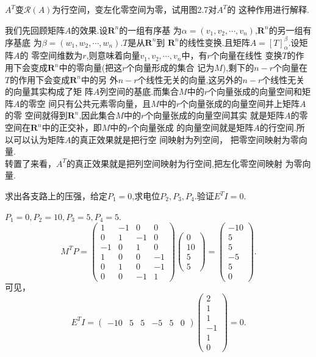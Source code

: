 ﻿\documentclass{book} \usepackage{exsheets} \usepackage{xeCJK}
\begin{document}
\begin{question}
  $A^T$变$\mathcal{R}(A)$为行空间，变左化零空间为零，试用图2.7对$A^T$的
  这种作用进行解释.
\end{question}
\begin{solution}
  我们先回顾矩阵$A$的效果.设$\mathbf{R}^{n}$的一组有序基
  为$\alpha=(v_1,v_2,\cdots,v_n)$,$\mathbf{R}^{n}$的另一组有序基底
  为$\beta=(w_{1},w_{2},\cdots,w_{n})$.$T$是从$\mathbf{R}^{n}$到
  $\mathbf{R}^{n}$的线性变换.且矩阵$A=[T]_{\alpha}^{\beta}$.设矩阵$A$的
  零空间维数为$r$,则意味着向量$v_1,v_2,\cdots,v_n$中，有$r$个向量在线性
  变换$T$的作用下会变成$\mathbf{R}^n$中的零向量(把这$r$个向量形成的集合
  记为$M$),剩下的$n-r$个向量在$T$的作用下会变成$\mathbf{R}^n$中的另
  外$n-r$个线性无关的向量,这另外的$n-r$个线性无关的向量其实构成了矩
  阵$A$列空间的基底.而集合$M$中的$r$个向量张成的向量空间和矩阵$A$的零空
  间只有公共元素零向量，且$M$中的$r$个向量张成的向量空间并上矩阵$A$的零
  空间就得到$\mathbf{R}^{n}$,因此集合$M$中的$r$个向量张成的向量空间其实
  就是矩阵$A$的零空间在$\mathbf{R}^n$中的正交补，即$M$中的$r$个向量张成
  的向量空间就是矩阵$A$的行空间.所以可以认为矩阵$A$的真正效果就是把行空
  间映射为列空间，
  把零空间映射为零向量.\\

  转置了来看，$A^T$的真正效果就是把列空间映射为行空间,把左化零空间映射
  为零向量.
\end{solution}
\begin{question}
  求出各支路上的压强，给定$P_1=0$,求电位$P_2,P_3,P_4$.验证$E^TI=0$.
\end{question}
\begin{solution}
  $P_{1}=0,P_2=10,P_3=5,P_4=5$.
$$
M^{T}P=
\begin{pmatrix}
  1&-1&0&0\\
  0&1&-1&0\\
  -1&0&1&0\\
  1&0&0&-1\\
  0&1&0&-1\\
  0&0&-1&1
\end{pmatrix}
\begin{pmatrix}
  0\\
  10\\
  5\\
  5
\end{pmatrix}=
\begin{pmatrix}
  -10\\
  5\\
  5\\
  -5\\
  5\\
  0
\end{pmatrix}.
$$
可见，
$$
E^TI=\begin{pmatrix} -10&5&5&-5&5&0
\end{pmatrix}
\begin{pmatrix}
  2\\
  1\\
  1\\
  -1\\
  1\\
  0
\end{pmatrix}=0.
$$
\end{solution}
\end{document}
